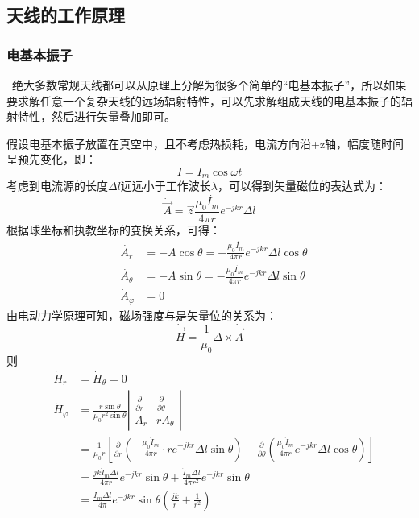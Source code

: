 \documentclass{article}
\begin{document}
\subsection{天线的工作原理}

\subsubsection{电基本振子}

\
绝大多数常规天线都可以从原理上分解为很多个简单的“电基本振子”，所以如果要求解任意一个复杂天线的远场辐射特性，可以先求解组成天线的电基本振子的辐射特性，然后进行矢量叠加即可。

假设电基本振子放置在真空中，且不考虑热损耗，电流方向沿+z轴，幅度随时间呈预先变化，即：
\[ I = I_m \cos \omega t \]
考虑到电流源的长度$\Delta
l$远远小于工作波长$\lambda$，可以得到矢量磁位的表达式为：
\[ \dot{\vec{A}} = \vec{z} \frac{\mu_0 \dot{I_m}}{4 \pi r} e^{- j k r} \Delta
   l \]
根据球坐标和执教坐标的变换关系，可得：
\begin{eqnarray*}
  & \dot{A_r} & = - A \cos \theta = - \frac{\mu_0 \dot{I_m}}{4 \pi r} e^{- j
  k r} \Delta l \cos \theta\\
  & \dot{A_{\theta}} & = - A \sin \theta = - \frac{\mu_0 \dot{I_m}}{4 \pi r}
  e^{- j k r} \Delta l \sin \theta\\
  & \dot{A}_{\varphi} & = 0
\end{eqnarray*}
由电动力学原理可知，磁场强度与是矢量位的关系为：
\[ \dot{\vec{H}} = \frac{1}{\mu_0} \Delta \times \dot{\vec{A}} \]
则
\begin{eqnarray}
  & \dot{H}_r & = \dot{H}_{\theta} = 0 \nonumber\\
  & \dot{H}_{\varphi} & = \frac{r \sin \theta}{\mu_0 r^2 \sin \theta}
  \left|\begin{array}{cc}
    \frac{\partial}{\partial r} & \frac{\partial}{\partial \theta}\\
    A_r & r A_{\theta}
  \end{array}\right| \nonumber\\
  &  & = \frac{1}{\mu_0 r} \left[ \frac{\partial}{\partial r} \left( -
  \frac{\mu_0 \dot{I}_m}{4 \pi r} \cdot r e^{- j k r} \Delta l \sin \theta
  \right) - \frac{\partial}{\partial \theta} \left( \frac{\mu_0 \dot{I}_m}{4
  \pi r} e^{- j k r} \Delta l \cos \theta \right) \right] \\
  &  & = \frac{j k \dot{I}_m \Delta l}{4 \pi r} e^{- j k r} \sin \theta +
  \frac{\dot{I}_m \Delta l}{4 \pi r^2} e^{- j k r} \sin \theta \nonumber\\
  &  & = \frac{\dot{I}_m \Delta l}{4 \pi} e^{- j k r} \sin \theta \left(
  \frac{j k}{r} + \frac{1}{r^2} \right) \nonumber
\end{eqnarray}
\end{document}
